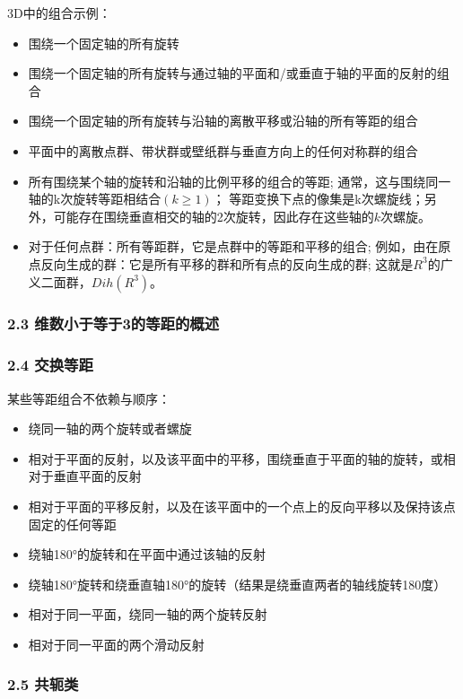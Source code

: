 3D中的组合示例：

\begin{itemize}
\item 围绕一个固定轴的所有旋转
\item 围绕一个固定轴的所有旋转与通过轴的平面和/或垂直于轴的平面的反射的组合
\item 围绕一个固定轴的所有旋转与沿轴的离散平移或沿轴的所有等距的组合
\item 平面中的离散点群、带状群或壁纸群与垂直方向上的任何对称群的组合
\item 所有围绕某个轴的旋转和沿轴的比例平移的组合的等距; 通常，这与围绕同一轴的k次旋转等距相结合$(k \geq 1)$； 等距变换下点的像集是k次螺旋线；另外，可能存在围绕垂直相交的轴的2次旋转，因此存在这些轴的$k$次螺旋。
\item 对于任何点群：所有等距群，它是点群中的等距和平移的组合; 例如，由在原点反向生成的群：它是所有平移的群和所有点的反向生成的群; 这就是$R^3$的广义二面群，$Dih(R^3)$。
\end{itemize}

\subsubsection{2.3 维数小于等于3的等距的概述}



\subsubsection{2.4 交换等距}

某些等距组合不依赖与顺序：

\begin{itemize}
\item 绕同一轴的两个旋转或者螺旋
\item 相对于平面的反射，以及该平面中的平移，围绕垂直于平面的轴的旋转，或相对于垂直平面的反射
\item 相对于平面的平移反射，以及在该平面中的一个点上的反向平移以及保持该点固定的任何等距
\item 绕轴180°的旋转和在平面中通过该轴的反射
\item 绕轴180°旋转和绕垂直轴180°的旋转（结果是绕垂直两者的轴线旋转180度）
\item 相对于同一平面，绕同一轴的两个旋转反射
\item 相对于同一平面的两个滑动反射
\end{itemize}


\subsubsection{2.5 共轭类}

